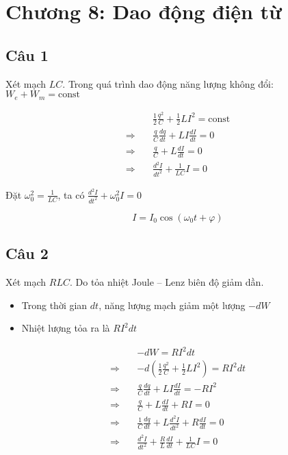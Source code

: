 \section[Chương 8]{Chương 8: Dao động điện từ}

\subsection{Câu 1}

Xét mạch $LC$. Trong quá trình dao động năng lượng không đổi: $W_e + W_m = \text{const}$

\begin{align*}
  {}\quad & \frac{1}{2} \frac{q^2}{C} + \frac{1}{2} LI^2 = \text{const} \\
  \Rightarrow\quad & \frac{q}{C} \frac{dq}{dt} + LI \frac{dI}{dt} = 0 \\
  \Rightarrow\quad & \frac{q}{C} + L\frac{dI}{dt} = 0 \\
  \Rightarrow\quad & \frac{d^2I}{dt^2} + \frac{1}{LC} I = 0
\end{align*}

Đặt $\omega_0^2 = \frac{1}{LC}$, ta có $\frac{d^2I}{dt^2} + \omega_0^2 I = 0$

\begin{equation*}
  I = I_0 \cos\left( \omega_0 t + \varphi \right)
\end{equation*}

\subsection{Câu 2}

Xét mạch $RLC$. Do tỏa nhiệt Joule -- Lenz biên độ giảm dần. 

\begin{itemize}
  \item Trong thời gian $dt$, năng lượng mạch giảm một lượng $-dW$
  \item Nhiệt lượng tỏa ra là $RI^2dt$
\end{itemize}

\begin{align*}
  {}\quad & -dW = RI^2dt \\
  \Rightarrow\quad & -d\left( \frac{1}{2} \frac{q^2}{C} + \frac{1}{2} LI^2 \right) = RI^2dt \\
  \Rightarrow\quad & \frac{q}{C} \frac{dq}{dt} + LI \frac{dI}{dt} = -RI^2 \\
  \Rightarrow\quad & \frac{q}{C} + L\frac{dI}{dt} + RI = 0 \\ 
  \Rightarrow\quad & \frac{1}{C} \frac{dq}{dt} + L\frac{d^2I}{dt^2} + R\frac{dI}{dt} = 0 \\
  \Rightarrow\quad & \frac{d^2I}{dt^2} + \frac{R}{L} \frac{dI}{dt} + \frac{1}{LC} I = 0
\end{align*}

